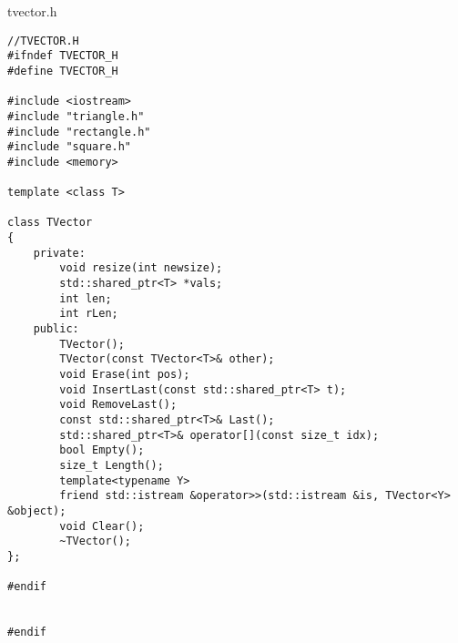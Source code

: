 \documentclass[12pt]{article}
\begin{document}
\begin{flushleft}
{\Huge tvector.h}
\begin{verbatim}
//TVECTOR.H
#ifndef TVECTOR_H
#define TVECTOR_H

#include <iostream>
#include "triangle.h"
#include "rectangle.h"
#include "square.h"
#include <memory>

template <class T>

class TVector
{
	private:
		void resize(int newsize);
		std::shared_ptr<T> *vals;
		int len;
		int rLen;
	public:
		TVector();
		TVector(const TVector<T>& other);
		void Erase(int pos);
		void InsertLast(const std::shared_ptr<T> t);
		void RemoveLast();
		const std::shared_ptr<T>& Last();
		std::shared_ptr<T>& operator[](const size_t idx);
		bool Empty();
		size_t Length();
		template<typename Y>
  		friend std::istream &operator>>(std::istream &is, TVector<Y> &object);
		void Clear();
		~TVector();
};

#endif


#endif
\end{verbatim}
\end{flushleft}
    \pagebreak
\end{document}
